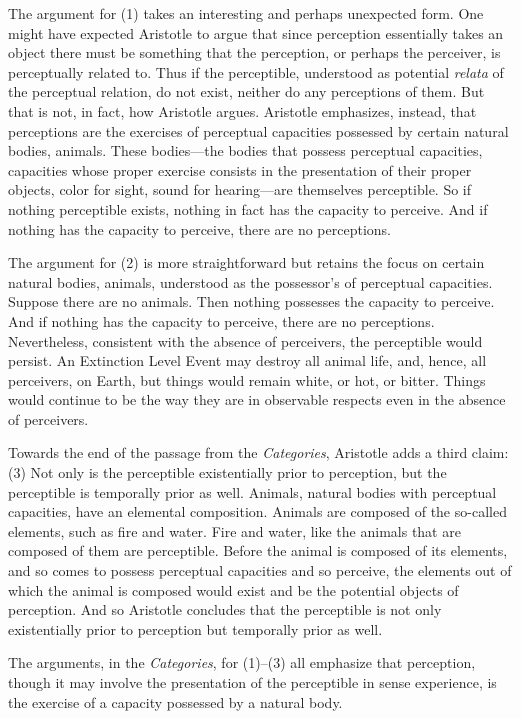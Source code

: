 The argument for (1) takes an interesting and perhaps unexpected form. One might have expected Aristotle to argue that since perception essentially takes an object there must be something that the perception, or perhaps the perceiver, is perceptually related to. Thus if the perceptible, understood as potential \emph{relata} of the perceptual relation, do not exist, neither do any perceptions of them. But that is not, in fact, how Aristotle argues. Aristotle emphasizes, instead, that perceptions are the exercises of perceptual capacities possessed by certain natural bodies, animals. These bodies---the bodies that possess perceptual capacities, capacities whose proper exercise consists in the presentation of their proper objects, color for sight, sound for hearing---are themselves perceptible. So if nothing perceptible exists, nothing in fact has the capacity to perceive. And if nothing has the capacity to perceive, there are no perceptions. 

The argument for (2) is more straightforward but retains the focus on certain natural bodies, animals, understood as the possessor's of perceptual capacities. Suppose there are no animals. Then nothing possesses the capacity to perceive. And if nothing has the capacity to perceive, there are no perceptions. Nevertheless, consistent with the absence of perceivers, the perceptible would persist. An Extinction Level Event may destroy all animal life, and, hence, all perceivers, on Earth, but things would remain white, or hot, or bitter. Things would continue to be the way they are in observable respects even in the absence of perceivers.

Towards the end of the passage from the \emph{Categories}, Aristotle adds a third claim: (3) Not only is the perceptible existentially prior to perception, but the perceptible is temporally prior as well. Animals, natural bodies with perceptual capacities, have an elemental composition. Animals are composed of the so-called elements, such as fire and water. Fire and water, like the animals that are composed of them are perceptible. Before the animal is composed of its elements, and so comes to possess perceptual capacities and so perceive, the elements out of which the animal is composed would exist and be the potential objects of perception. And so Aristotle concludes that the perceptible is not only existentially prior to perception but temporally prior as well.

The arguments, in the \emph{Categories}, for (1)--(3) all emphasize that perception, though it may involve the presentation of the perceptible in sense experience, is the exercise of a capacity possessed by a natural body.



